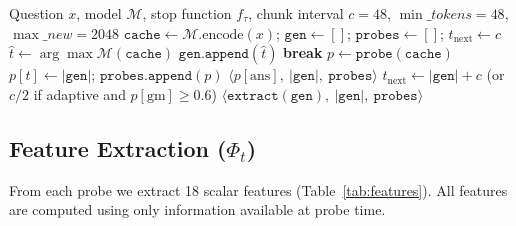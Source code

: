 \documentclass[11pt]{article}
\begin{document}
\begin{algorithm}[t]
\caption{Zelt Early-Exit Inference}
\label{alg:main}
\begin{algorithmic}[1]
\Require Question $x$, model $\mathcal{M}$, stop function $f_{\tau}$,
         chunk interval $c=48$, $\min\_tokens=48$, $\max\_new=2048$
\State $\texttt{cache} \leftarrow \mathcal{M}.\text{encode}(x)$;
       $\texttt{gen} \leftarrow []$;
       $\texttt{probes} \leftarrow []$;
       $t_{\text{next}} \leftarrow c$
  \State $\hat{t} \leftarrow \arg\max \mathcal{M}(\texttt{cache})$
  \State $\texttt{gen.append}(\hat{t})$
   \textbf{break} \EndIf
    \State $p \leftarrow \texttt{probe}(\texttt{cache})$
    \State $p[t] \leftarrow |\texttt{gen}|$;
           $\texttt{probes.append}(p)$
      \State \Return $\langle p[\text{ans}],\ |\texttt{gen}|,\ \texttt{probes}\rangle$
    \EndIf
    \State $t_{\text{next}} \leftarrow |\texttt{gen}| + c$
           (or $c/2$ if adaptive and $p[\text{gm}] \ge 0.6$)
  \EndIf
\EndWhile
\State \Return $\langle \texttt{extract}(\texttt{gen}),\ |\texttt{gen}|,\ \texttt{probes}\rangle$
\end{algorithmic}
\end{algorithm}

\subsection{Feature Extraction ($\Phi_t$)}
\label{sec:features}

From each probe we extract 18 scalar features (Table~\ref{tab:features}).
All features are computed using only information available at probe time.
\end{document}
